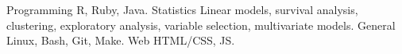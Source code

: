 


\begin{cvskills}

\cvskill
{Programming} %
{R, Ruby, Java.} %
\cvskill
{Statistics} %
{Linear models, survival analysis, clustering, exploratory analysis, 
variable selection, multivariate models.} %
\cvskill
{General} %
{Linux, Bash, Git, Make.} %
\cvskill
{Web} %
{HTML/CSS, JS.} %

\end{cvskills}
